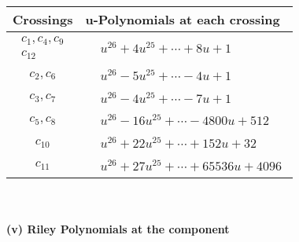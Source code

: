 \documentclass[1p]{elsarticle_modified}
\theoremstyle{definition}
\begin{document}
\begin{tabular}{m{50pt}|m{274pt}}
Crossings & \hspace{64pt}u-Polynomials at each crossing \\
\hline $$\begin{aligned}c_{1},c_{4},c_{9}\\c_{12}\end{aligned}$$&$\begin{aligned}
&u^{26}+4 u^{25}+\cdots+8 u+1
\end{aligned}$\\
\hline $$\begin{aligned}c_{2},c_{6}\end{aligned}$$&$\begin{aligned}
&u^{26}-5 u^{25}+\cdots-4 u+1
\end{aligned}$\\
\hline $$\begin{aligned}c_{3},c_{7}\end{aligned}$$&$\begin{aligned}
&u^{26}-4 u^{25}+\cdots-7 u+1
\end{aligned}$\\
\hline $$\begin{aligned}c_{5},c_{8}\end{aligned}$$&$\begin{aligned}
&u^{26}-16 u^{25}+\cdots-4800 u+512
\end{aligned}$\\
\hline $$\begin{aligned}c_{10}\end{aligned}$$&$\begin{aligned}
&u^{26}+22 u^{25}+\cdots+152 u+32
\end{aligned}$\\
\hline $$\begin{aligned}c_{11}\end{aligned}$$&$\begin{aligned}
&u^{26}+27 u^{25}+\cdots+65536 u+4096
\end{aligned}$\\
\hline
\end{tabular}\\~\\
\newpage\renewcommand{\arraystretch}{1}
\flushleft \textbf{(v) Riley Polynomials at the component}\newline \\
\end{document}
